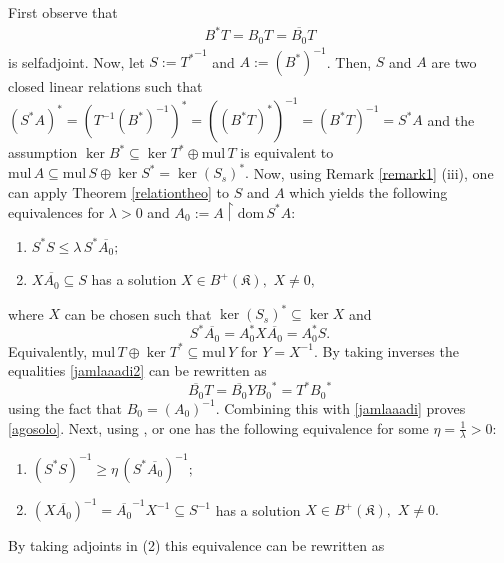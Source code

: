 \documentclass{amsart}
\makeatletter
\newcommand{\kk}{\mathfrak{K}}
\newcommand{\mul}{\mathrm{mul} \, }
\newcommand{\D}{\mathrm{dom}\,}
\newcommand{\adj}{^*}
\newcommand{\inv}{^{-1}}
\newcommand{\tstar}{T^{*}}
\newcommand{\half}{^{\frac{1}{2}}}
\newcommand{\inclu}{\subseteq}
\newcommand{\lplusk}{B^{+}(\kk)}
\newcommand{\rest}{\upharpoonright}
\numberwithin{equation}{section}
\renewenvironment{proof}[1][\proofname]{%
   \par\pushQED{\qed}\normalfont%
   \topsep6\p@\@plus6\p@\relax
   \trivlist\item[\hskip\labelsep\bfseries#1\@addpunct{.}]%
   \ignorespaces
}{%
   \popQED\endtrivlist\@endpefalse
}
\makeatother
\begin{document}
\begin{proof}
First observe that
\begin{eqnarray}   \label{jamlaaadi}
B\adj T =  B_0 T = \overline{B_0} T
\end{eqnarray}
is   selfadjoint.
Now, let  $S:={\tstar}\inv$  and $A:=(B\adj)\inv$. Then, $S$ and $A$ are two closed linear relations such that
 $
(S\adj A)\adj = ( T\inv ({B}\adj)\inv)\adj = ({({B}\adj T)\adj})\inv=({B}\adj T)\inv= S\adj A$
and the assumption $\ker {B}\adj \inclu  \ker T^* \oplus \mul T$ is equivalent to $\mul{A} \inclu \mul{S} \oplus \ker{S\adj}  = \ker (S_s)\adj.$
Now,  using Remark \ref{remark1} (iii), one can apply  Theorem  \ref{relationtheo} to $S$ and $A$ which yields  the following equivalences for   $\lambda > 0$ and $A_0:= A \rest \D S\adj A$:  %
\begin{enumerate}
   \item $S^* S  \leq \lambda \, S\adj \overline{A_0};$
     \item $  X \overline{A_0} \inclu S   $ has a solution $X \in \lplusk,$  $X \neq 0,$
\end{enumerate}
where  $X$ can be chosen such that $\ker (S_s)\adj  \inclu \ker X$  and
     \begin{equation}\label{jamlaaadi2}
         S\adj \overline{A_0} =  A_0 \adj X \overline{A_0}= A_0\adj S  .
     \end{equation}
Equivalently,  $ \mul T   \oplus \ker \tstar \inclu \mul Y $   for $Y = X\inv .$  By taking inverses  the equalities \eqref{jamlaaadi2} can be rewritten as
     $$
    \overline{B_0} T  =  \overline{B_0} Y {B_0}^{*} =  \tstar {B_0}^{*}
     $$
using the fact that $ B_0=   \left( A_0 \right)\inv .$
Combining this with \eqref{jamlaaadi} proves \eqref{agosolo}.
Next, using \cite[Lemma $3.3$]{hassi2006form}, or \cite[Corollary 5.2.8]{behrndt2020boundary} one has the following equivalence for some $\eta= \frac{1}{\lambda} > 0:$
\begin{enumerate}
   \item $(S^* S)\inv  \geq  \eta \, (S\adj \overline{A_0})\inv ;$
   \item $  (X \overline{A_0})\inv =\overline{A_0}\inv X\inv  \inclu S\inv   $ has a solution $X \in \lplusk,$ $X \neq 0.$
\end{enumerate}
By taking adjoints in (2) this equivalence can be rewritten as 

\end{proof}
\end{document}
